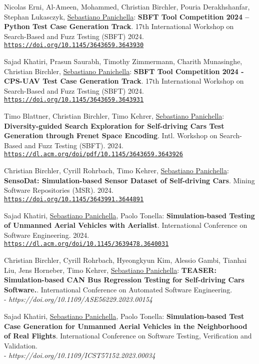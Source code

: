 \documentclass[10pt]{article}
\providecommand*\url[1]{\href{#1}{#1}}
\renewcommand*\url[1]{\href{#1}{\texttt{#1}}}
\begin{document}
\begin{bibenum}
   		\item \label{Cm31} Nicolas Erni, Al-Ameen, Mohammed, Christian Birchler, Pouria Derakhshanfar, Stephan Lukasczyk, \underline{Sebastiano Panichella}: \textbf{ SBFT Tool Competition 2024 -- Python Test Case Generation Track}. 17th International Workshop on Search-Based and Fuzz Testing (SBFT) 2024. \\\url{https://doi.org/10.1145/3643659.3643930}
   		\item \label{Cm30} Sajad Khatiri, Prasun Saurabh, Timothy Zimmermann, Charith Munasinghe, Christian Birchler, \underline{Sebastiano Panichella}: \textbf{SBFT Tool Competition 2024 - CPS-UAV Test Case Generation Track}. 17th International Workshop on Search-Based and Fuzz Testing (SBFT) 2024.  \\\url{https://doi.org/10.1145/3643659.3643931}
   		\item \label{Cm29}  Timo Blattner, Christian Birchler, Timo Kehrer, \underline{Sebastiano Panichella}: \textbf{Diversity-guided Search Exploration for Self-driving Cars Test Generation through Frenet Space Encoding}. Intl. Workshop on Search-Based and Fuzz Testing (SBFT). 2024. \\\url{https://dl.acm.org/doi/pdf/10.1145/3643659.3643926}
   		\item \label{Cm28} Christian Birchler, Cyrill Rohrbach, Timo Kehrer, \underline{Sebastiano Panichella}: \textbf{SensoDat: Simulation-based Sensor Dataset of Self-driving Cars}. Mining Software Repositories (MSR). 2024.\\\url{https://doi.org/10.1145/3643991.3644891}
   		\item \label{Cm27} Sajad Khatiri, \underline{Sebastiano Panichella}, Paolo Tonella: \textbf{Simulation-based Testing of Unmanned Aerial Vehicles with Aerialist}.        International Conference on Software Engineering. 2024. \\\url{https://dl.acm.org/doi/10.1145/3639478.3640031}
   		\item \label{Cm26} Christian Birchler, Cyrill Rohrbach, Hyeongkyun Kim, Alessio Gambi, Tianhai Liu, Jens Horneber, Timo Kehrer, \underline{Sebastiano Panichella}: \textbf{TEASER: Simulation-based CAN Bus Regression Testing for Self-driving Cars Software.}.    International Conference on Automated Software Engineering. \\- \textit{https://doi.org/10.1109/ASE56229.2023.00154}
   		\item \label{Cm25} Sajad Khatiri, \underline{Sebastiano Panichella}, Paolo Tonella: \textbf{Simulation-based Test Case Generation for Unmanned Aerial Vehicles in the Neighborhood of Real Flights}.    International Conference on Software Testing, Verification and Validation.\\ - \textit{https://doi.org/10.1109/ICST57152.2023.00034}

\end{bibenum}
\end{document}
